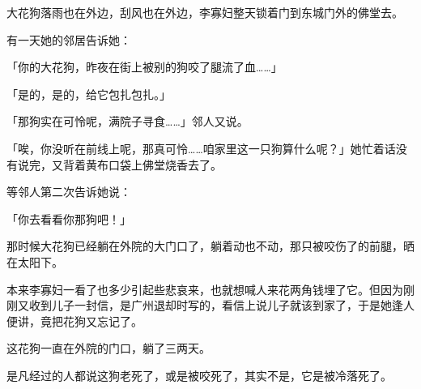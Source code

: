 \documentclass[UTF8]{ctexart}
\begin{document}
大花狗落雨也在外边，刮风也在外边，李寡妇整天锁着门到东城门外的佛堂去。

有一天她的邻居告诉她：

「你的大花狗，昨夜在街上被别的狗咬了腿流了血……」

「是的，是的，给它包扎包扎。」

「那狗实在可怜呢，满院子寻食……」邻人又说。

「唉，你没听在前线上呢，那真可怜……咱家里这一只狗算什么呢？」她忙着话没有说完，又背着黄布口袋上佛堂烧香去了。

等邻人第二次告诉她说：

「你去看看你那狗吧！」

那时候大花狗已经躺在外院的大门口了，躺着动也不动，那只被咬伤了的前腿，晒在太阳下。

本来李寡妇一看了也多少引起些悲哀来，也就想喊人来花两角钱埋了它。但因为刚刚又收到儿子一封信，是广州退却时写的，看信上说儿子就该到家了，于是她逢人便讲，竟把花狗又忘记了。

这花狗一直在外院的门口，躺了三两天。

是凡经过的人都说这狗老死了，或是被咬死了，其实不是，它是被冷落死了。
\end{document}
